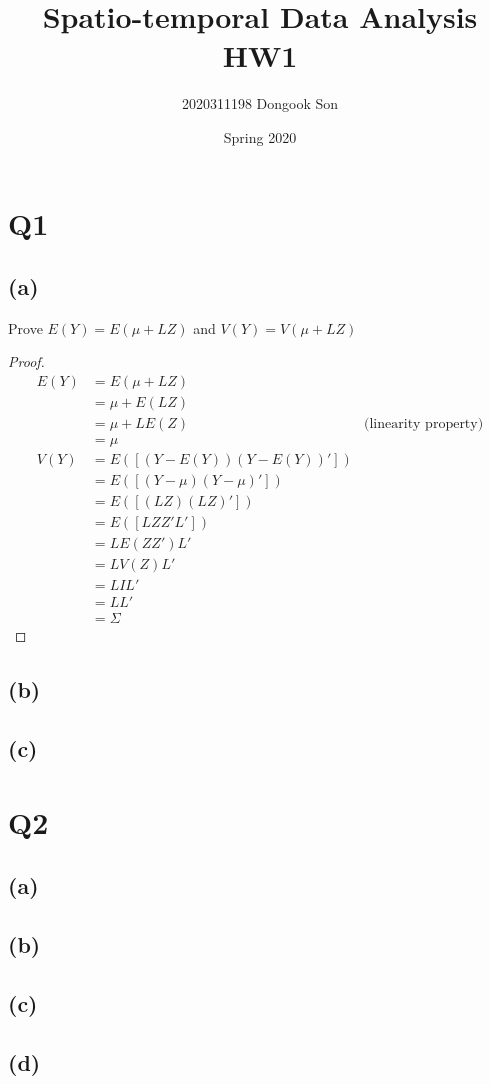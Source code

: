\documentclass[11pt]{article}
\title{Spatio-temporal Data Analysis HW1}
\author{2020311198 Dongook Son}
\date{Spring 2020}
\begin{document}
\maketitle

\section*{Q1}
\subsection*{(a)}
Prove $E(Y)=E(\mu+LZ)$ and $V(Y)=V(\mu+LZ)$

\begin{proof}
  \begin{align*}
    E(Y) &= E(\mu + LZ) \\
    &= \mu+E(LZ) \\
    &= \mu+LE(Z) & \text{(linearity property)} \\
    &= \mu \\
    V(Y) &= E([(Y-E(Y))(Y-E(Y))']) \\
    &= E([(Y-\mu)(Y-\mu)']) \\
    &= E([(LZ)(LZ)']) \\
    &= E([LZZ'L']) \\
    &= LE(ZZ')L' \\
    &= LV(Z)L' \\
    &= LIL' \\
    &= LL' \\
    &= \Sigma
  \end{align*}
\end{proof}

\subsection*{(b)}
\subsection*{(c)}
 


\section*{Q2}
\subsection*{(a)}
\subsection*{(b)}
\subsection*{(c)}
\subsection*{(d)}
 
\end{document}
